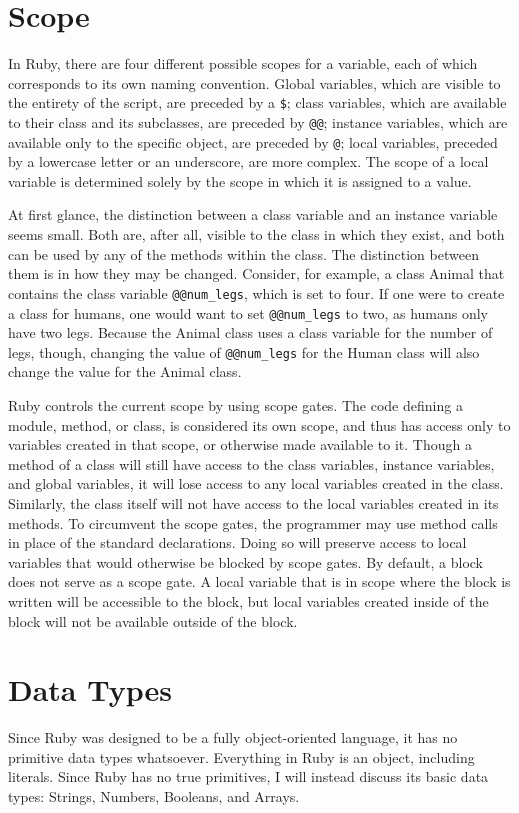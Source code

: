 \documentclass[12pt]{article}
\begin{document}
\section{Scope}
In Ruby, there are four different possible scopes for a variable, each of which corresponds to its own naming convention. Global variables, which are visible to the entirety of the script, are preceded by a \verb|$|; class variables, which are available to their class and its subclasses, are preceded by \verb|@@|; instance variables, which are available only to the specific object, are preceded by \verb|@|; local variables, preceded by a lowercase letter or an underscore, are more complex. The scope of a local variable is determined solely by the scope in which it is assigned to a value\cite{darko}.

At first glance, the distinction between a class variable and an instance variable seems small. Both are, after all, visible to the class in which they exist, and both can be used by any of the methods within the class. The distinction between them is in how they may be changed. Consider, for example, a class Animal that contains the class variable \verb|@@num_legs|, which is set to four. If one were to create a class for humans, one would want to set \verb|@@num_legs| to two, as humans only have two legs. Because the Animal class uses a class variable for the number of legs, though, changing the value of \verb|@@num_legs| for the Human class will also change the value for the Animal class\cite{darko}.

Ruby controls the current scope by using scope gates. The code defining a module, method, or class, is considered its own scope, and thus has access only to variables created in that scope, or otherwise made available to it. Though a method of a class will still have access to the class variables, instance variables, and global variables, it will lose access to any local variables created in the class. Similarly, the class itself will not have access to the local variables created in its methods. To circumvent the scope gates, the programmer may use method calls in place of the standard declarations. Doing so will preserve access to local variables that would otherwise be blocked by scope gates. By default, a block does not serve as a scope gate. A local variable that is in scope where the block is written will be accessible to the block, but local variables created inside of the block will not be available outside of the block\cite{darko}. 


\section{Data Types}
Since Ruby was designed to be a fully object-oriented language, it has no primitive data types whatsoever. Everything in Ruby is an object, including literals. Since Ruby has no true primitives, I will instead discuss its basic data types: Strings, Numbers, Booleans, and Arrays.
\end{document}

